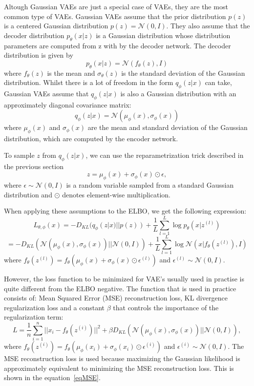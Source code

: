 Altough Gaussian VAEs are just a special case of VAEs, they are the most common type of VAEs. Gaussian VAEs assume that the prior distribution $p(z)$ is a centered Gaussian distribution $ p(z) = \mathcal{N}(0, I)$. They also assume that the decoder distribution $p_{\theta}(x|z)$ is a Gaussian distribution whose distribution parameters are computed from z with by the decoder network. The decoder distribution is given by
\[ p_{\theta}(x|z) = \mathcal{N}(f_{\theta}(z), I) \]
where $f_{\theta}(z)$ is the mean and $\sigma_{\theta}(z)$ is the standard deviation of the Gaussian distribution. Whilst there is a lot of freedom in the form $q_{\phi}(z|x)$ can take, Gaussian VAEs assume that $q_{\phi}(z|x)$ is also a Gaussian distribution with an approximately diagonal covariance matrix: 
\[ q_{\phi}(z|x) = \mathcal{N}(\mu_{\phi}(x), \sigma_{\phi}(x)) \]
where $\mu_{\phi}(x)$ and $\sigma_{\phi}(x)$ are the mean and standard deviation of the Gaussian distribution, which are computed by the encoder network.

To sample $z$ from $q_{\phi}(z|x)$, we can use the reparametrization trick described in the previous section
\[ z = \mu_{\phi}(x) + \sigma_{\phi}(x) \odot \epsilon, \] 
where $\epsilon \sim \mathcal{N}(0, I)$ is a random variable sampled from a standard Gaussian distribution and $\odot$ denotes element-wise multiplication.

When applying these assumptions to the ELBO, we get the following expression: \[ L_{\theta, \phi}(x) = - D_{KL}(q_{\phi}(z|x) || p(z)) + \frac{1}{L} \sum_{l=1}^{L} \log p_{\theta}(x|z^{(l)}) \]
\[ = - D_{KL}(\mathcal{N}(\mu_{\phi}(x), \sigma_{\phi}(x)) || \mathcal{N}(0, I)) + \frac{1}{L} \sum_{l=1}^{L} \log \mathcal{N}(x|f_{\theta}(z^{(l)}), I) \]
where $f_{\theta}(z^{(l)}) = f_{\theta}(\mu_{\phi}(x) + \sigma_{\phi}(x) \odot \epsilon^{(l)})$ and $\epsilon^{(l)} \sim \mathcal{N}(0, I)$.

However, the loss function to be minimized for VAE's usually used in practise is quite different from the ELBO negative. The function that is used in practice consists of: Mean Squared Error (MSE) reconstruction loss, KL divergence regularization loss and a constant $\beta$ that controls the importance of the regularization term:
\[ L = \frac{1}{n} \sum_{i=1}^{n} ||x_i - f_{\theta}(z^{(i)}) ||^2 + \beta  D_{KL}(\mathcal{N}(\mu_{\phi}(x), \sigma_{\phi}(x)) || \mathcal{N}(0, I)), \]
where $f_{\theta}(z^{(i)}) = f_{\theta}(\mu_{\phi}(x_i) + \sigma_{\phi}(x_i) \odot \epsilon^{(i)})$ and $\epsilon^{(i)} \sim \mathcal{N}(0, I)$. The MSE reconstruction loss is used because maximizing the Gaussian likelihood is approximately equivalent to minimizing the MSE reconstruction loss. This is shown in the equation~\ref{eqMSE}.

